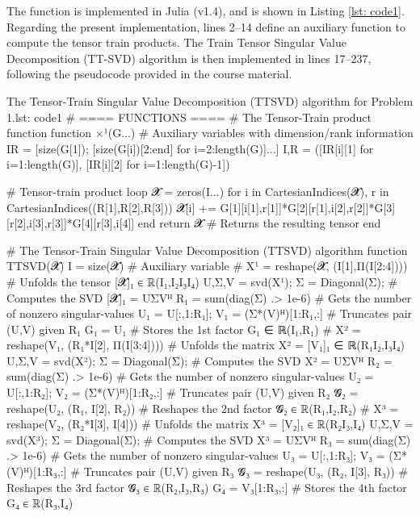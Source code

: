 \documentclass[a4paper,10pt]{article} %
\begin{document}
\begin{solution} \justifying

\noindent The function is implemented in Julia (v1.4), and is shown in Listing \ref{lst: code1}.  Regarding the present implementation, lines 2--14 define an auxiliary function to compute the tensor train products. The Train Tensor Singular Value Decomposition (TT-SVD) algorithm is then implemented in lines 17--237, following the pseudocode provided in the course material. 

\begin{code}[0.95\textwidth]{The Tensor-Train Singular Value Decomposition (TTSVD) algorithm for Problem 1.}{lst: code1}
# ==== FUNCTIONS ====
# The Tensor-Train product function
function ×¹(G...)
    # Auxiliary variables with dimension/rank information
    IR  = [size(G[1]); [size(G[i])[2:end] for i=2:length(G)]...]
    I,R = ([IR[i][1] for i=1:length(G)], [IR[i][2] for i=1:length(G)-1])
    
    # Tensor-train product loop
    𝓧 = zeros(I...)
    for i in CartesianIndices(𝓧), r in CartesianIndices((R[1],R[2],R[3]))
        𝓧[i] += G[1][i[1],r[1]]*G[2][r[1],i[2],r[2]]*G[3][r[2],i[3],r[3]]*G[4][r[3],i[4]]
    end
    return 𝓧    # Returns the resulting tensor
end

# The Tensor-Train Singular Value Decomposition (TTSVD) algorithm
function TTSVD(𝓧)
    I = size(𝓧)                                     # Auxiliary variable
                                                    #
    X¹ = reshape(𝓧, (I[1],Π(I[2:4])))               # Unfolds the tensor [𝓧]₁ ∈ ℝ(I₁,I₂I₃I₄)
    U,Σ,V = svd(X¹);    Σ = Diagonal(Σ);            # Computes the SVD [𝓧]₁ = UΣVᴴ
    R₁ = sum(diag(Σ) .> 1e-6)                       # Gets the number of nonzero singular-values
    U₁ = U[:,1:R₁];  V₁ = (Σ*(V)ᴴ)[1:R₁,:]          # Truncates pair (U,V) given R₁
    G₁ = U₁                                         # Stores the 1st factor G₁ ∈ ℝ(I₁,R₁)
                                                    #
    X² = reshape(V₁, (R₁*I[2], Π(I[3:4])))          # Unfolds the matrix X² = [V₁]₁ ∈ ℝ(R₁I₂,I₃I₄)
    U,Σ,V = svd(X²);    Σ = Diagonal(Σ);            # Computes the SVD X² = UΣVᴴ
    R₂ = sum(diag(Σ) .> 1e-6)                       # Gets the number of nonzero singular-values
    U₂ = U[:,1:R₂];  V₂ = (Σ*(V)ᴴ)[1:R₂,:]          # Truncates pair (U,V) given R₂
    𝓖₂ = reshape(U₂, (R₁, I[2], R₂))                # Reshapes the 2nd factor 𝓖₂ ∈ ℝ(R₁,I₂,R₂)
                                                    # 
    X³ = reshape(V₂, (R₂*I[3], I[4]))               # Unfolds the matrix X³ = [V₂]₁ ∈ ℝ(R₂I₃,I₄)
    U,Σ,V = svd(X³);    Σ = Diagonal(Σ);            # Computes the SVD X³ = UΣVᴴ
    R₃ = sum(diag(Σ) .> 1e-6)                       # Gets the number of nonzero singular-values
    U₃ = U[:,1:R₃];  V₃ = (Σ*(V)ᴴ)[1:R₃,:]          # Truncates pair (U,V) given R₃
    𝓖₃ = reshape(U₃, (R₂, I[3], R₃))                # Reshapes the 3rd factor 𝓖₃ ∈ ℝ(R₂,I₃,R₃)
    G₄ = V₃[1:R₃,:]                                 # Stores the 4th factor G₄ ∈ ℝ(R₃,I₄)


\end{code}
\end{solution}
\end{document}
